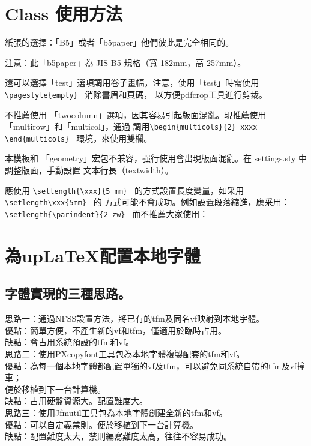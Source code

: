 \clearpage

\section{Class 使用方法}


\par 紙張的選擇：「B5」或者「b5paper」他們彼此是完全相同的。
\par 注意：此「b5paper」為 JIS B5 規格（寬 182mm，高 257mm）。
\par 還可以選擇「test」選項調用卷子畫幅，注意，使用「test」時需使用 \verb+\pagestyle{empty} + 消除書眉和頁碼，
以方便pdfcrop工具進行剪裁。
\par 不推薦使用 「twocolumn」選項，因其容易引起版面混亂。現推薦使用 「multirow」和「multicol」，通過
調用{\verb+\begin{multicols}{2} xxxx \end{multicols} + } 環境，來使用雙欄。

\par 本模板和 「geometry」宏包不兼容，强行使用會出現版面混亂。在 settings.sty 中調整版面，手動設置
文本行長（textwidth）。

\par 應使用 \verb+\setlength{\xxx}{5 mm} + 的方式設置長度變量，如采用\verb+\setlength\xxx{5mm} + 的
方式可能不會成功。例如設置段落縮進，應采用：{\verb+ \setlength{\parindent}{2 zw} + }
而不推薦大家使用：\\
{\uwave{\color{red}\verb+ \setlength\parindent{2 zw} + }}



\section{為up{\LaTeX}配置本地字體}

\subsection{字體實現的三種思路。}
\par\noindent
思路一：通過NFSS設置方法，將已有的tfm及同名vf映射到本地字體。\\
優點：簡單方便，不產生新的vf和tfm，僅適用於臨時占用。\\
缺點：會占用系統預設的tfm和vf。\\[5mm]
思路二：使用PXcopyfont工具包為本地字體複製配套的tfm和vf。\\
優點：為每一個本地字體都配置單獨的vf及tfm，可以避免同系統自帶的tfm及vf撞車；\\
\hspace{3zw}便於移植到下一台計算機。\\
缺點：占用硬盤資源大。配置難度大。\\[5mm]
思路三：使用Jfmutil工具包為本地字體創建全新的tfm和vf。\\
優點：可以自定義禁則。便於移植到下一台計算機。\\
缺點：配置難度太大，禁則編寫難度太高，往往不容易成功。


